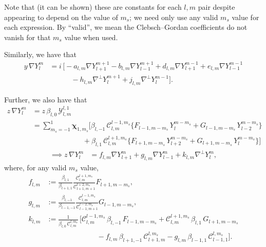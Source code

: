\documentclass[11pt, oneside]{article}   	%
\newcommand{\gradY}{\nabla Y}
\newcommand{\gradYlm}{\nabla Y^m_l}
\newcommand{\gradpY}{\nabla^\perp Y}
\newcommand{\curlyy}{\bm{\mathcal{Y}}}
\newcommand{\blone}{\beta_{l, 1}}
\newcommand{\blzero}{\beta_{l, 0}}
\newcommand{\blmone}{\beta_{l, -1}}
\newcommand{\chivec}{\bm{\chi}_{1,m_s}}
\newcommand{\cgcoeff}{\mathcal{C}}
\newcommand{\alm}{a_{l,m}}
\newcommand{\blm}{b_{l,m}}
\newcommand{\dlm}{d_{l,m}}
\newcommand{\elm}{e_{l,m}}
\newcommand{\flm}{f_{l,m}}
\newcommand{\glm}{g_{l,m}}
\newcommand{\hlm}{h_{l,m}}
\newcommand{\jlm}{j_{l,m}}
\newcommand{\klm}{k_{l,m}}
\begin{document}
Note that (it can be shown) these are constants for each \(l,m\) pair despite appearing to depend on the value of \(m_s\); we need only use any valid \(m_s\) value for each expression. By ``valid'', we mean the Clebsch--Gordan coefficients do not vanish for that \(m_s\) value when used. 

Similarly, we have that
\begin{align}
y \,\gradYlm &= i \, \Big[ -\alm \gradY^{m+1}_{l+1} - \blm \gradY^{m+1}_{l-1} + \dlm \gradY^{m-1}_{l+1} + \elm \gradY^{m-1}_{l-1} \nonumber \\
& \quad \quad \quad - \hlm \gradpY^{m+1}_{l} + \jlm \gradpY^{m-1}_{l} \Big].
\end{align}

Further, we also have that
\begin{align}
z \,\gradYlm 
&= z \, \blzero \, \curlyy^{l,1}_{l,m} \nonumber
\\
&= \sum_{m_s=-1}^{1} \chivec \Big[ \blmone \, \cgcoeff^{l-1,m_s}_{l,m} \big\{ F_{l-1,m-m_s} \, Y^{m-m_s}_{l} + G_{l-1,m-m_s} \, Y^{m-m_s}_{l-2} \big\} \nonumber \\ 
& \quad \quad \quad \quad \quad \quad \quad + \blone \, \cgcoeff^{l+1,m_s}_{l,m} \big\{ F_{l+1,m-m_s} \, Y^{m-m_s}_{l+2} + G_{l+1,m-m_s} \, Y^{m-m_s}_{l} \big\} \Big]
\end{align}
\begin{align}
\implies z \,\gradYlm &= \flm \gradY^{m}_{l+1} + \glm \gradY^{m}_{l-1} + \klm \gradpY^{m}_{l},
\end{align}
where, for any valid \(m_s\) value,
\begin{align}
\flm &:= \frac{\blone}{\beta_{l+1,1}} \frac{\cgcoeff^{l+1,m_s}_{l,m}}{\cgcoeff^{l+2,m_s}_{l+1,m+1}} F_{l+1,m-m_s}, \\
\glm &:= \frac{\blmone}{\beta_{l-1,-1}} \frac{\cgcoeff^{l-1,m_s}_{l,m}}{\cgcoeff^{l-2,m_s}_{l-1,m+1}} G_{l-1,m-m_s}, \\
\klm &:= \frac{1}{\blzero \, \cgcoeff^{l,m_s}_{l, m}} \, \Big[ \cgcoeff^{l-1,m_s}_{l,m} \, \blmone \, F_{l-1,m-m_s} + \cgcoeff^{l+1,m_s}_{l,m} \, \blone \, G_{l+1,m-m_s}  \nonumber \\
& \quad \quad \quad \quad \quad \quad \quad - \flm \, \beta_{l+1,-1} \, \cgcoeff^{l,m_s}_{l+1,m} - \glm \, \beta_{l-1,1} \, \cgcoeff^{l,m_s}_{l-1,1} \Big].
\end{align}
\end{document}
